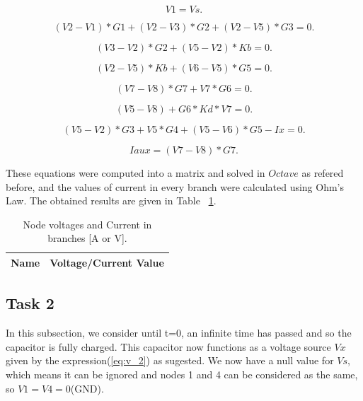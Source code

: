 \begin{equation}
  V1 = Vs.
  \label{eq:n1}
\end{equation}

\begin{equation}
  (V2 - V1)*G1 + (V2 - V3)*G2 + (V2 - V5)*G3 = 0.
  \label{eq:n2}
\end{equation}

\begin{equation}
  (V3 - V2)*G2	+ (V5 - V2)*Kb = 0.
  \label{eq:n3}
\end{equation}

\begin{equation}
  (V2 - V5)*Kb + (V6 - V5)*G5 = 0.
  \label{eq:n4}
\end{equation}

\begin{equation}
  (V7 - V8)*G7 + V7*G6 = 0.
  \label{eq:n5}
\end{equation}

\begin{equation}
  (V5 - V8) + G6*Kd*V7 = 0.
  \label{eq:n6}
\end{equation}

\begin{equation}
  (V5 - V2)*G3	+ V5*G4 + (V5 - V6)*G5 - Ix = 0.
  \label{eq:n7}
\end{equation}

\begin{equation}
  Iaux = (V7 - V8)*G7.
  \label{eq:n8}
\end{equation}


These equations were computed into a matrix and solved in $Octave$ as refered before, and the values of current in every branch were calculated using Ohm's Law. The obtained results are given in Table ~\ref{tab:r1}.


\begin{table}[h]
  \centering
  \begin{tabular}{|l|r|}
    \hline    
    {\bf Name} & {\bf Voltage/Current Value}\\ \hline
    
  \end{tabular}
  \caption{Node voltages and Current in branches [A or V].}
  \label{tab:r1}
\end{table}

\newpage

\subsection{Task 2}
In this subsection, we consider until t=0, an infinite time has passed and so the capacitor is fully charged. This capacitor now functions as a voltage source $Vx$ given by the expression(\ref{eq:v_2}) as sugested. We now have a null value for $Vs$, which means it can be ignored and nodes 1 and 4 can be considered as the same, so $V1=V4=0$(GND).

